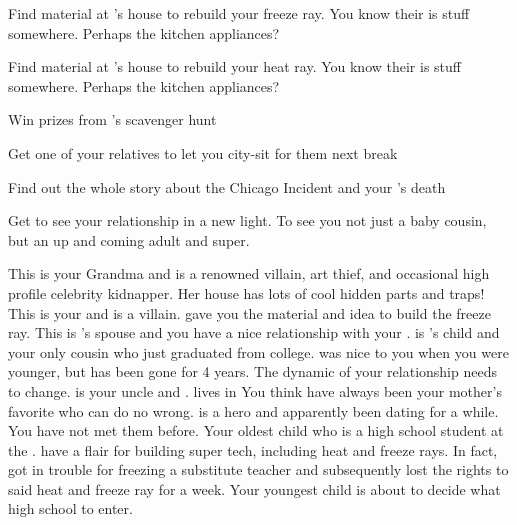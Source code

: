 \documentclass[char]{LRSguildcamp1}
\begin{document}
 
\begin{itemz}[Goals]
	\item Find material at \cGrandma{}'s house to rebuild your freeze ray. You know their is stuff somewhere. Perhaps the kitchen appliances? 
		\item Find material at \cGrandma{}'s house to rebuild your heat ray. You know their is stuff somewhere. Perhaps the kitchen appliances? 
		\item Win prizes from \cGrandma{}'s scavenger hunt
		\item Get one of your relatives to let you city-sit for them next break
		\item Find out the whole story about the Chicago Incident and your \cAS{\parent}'s death
		\item Get \cGrad{} to see your relationship in a new light. To see you not just a baby cousin, but an up and coming adult and super.
\end{itemz}

\begin{itemz}[Notes]
	\item 
\end{itemz}
\begin{contacts}
	\contact{\cGrandma{}} This is your Grandma and is a renowned villain, art thief, and occasional high profile celebrity kidnapper. Her house has lots of cool hidden parts and traps!
	\contact{\cOldest{}} This is your  \cOldest{\uncle} and is a villain.  gave you the material and idea to build the freeze ray.
	\contact{\cOS{}} This is \cOldest{}'s spouse and you have a nice relationship with your \cOS{\uncle}.
	\contact{\cGrad{}} \cGrad{} is \cOldest{}'s child and your only cousin who just graduated from college. \cGrad{} was nice to you when you were younger, but has been gone for 4 years. The dynamic of your relationship needs to change. 
	\contact{\cYoungest{}} \cYoungest{} is your uncle and \cYoungest{\hero}. \cYoungest{} lives in You think  have always been your mother's favorite who can do no wrong. 
	\contact{\cYS{}} \cYS{} is a hero and apparently been dating \cYoungest{} for a while. You have not met them before. 
	\contact{\cTeen{}} Your oldest child who is a high school student at the \pSuperSchool{}. \cTeen{\they} have a flair for building super tech, including heat and freeze rays. In fact, \cTeen{} got in trouble for freezing a substitute teacher and subsequently lost the rights to said heat and freeze ray for a week. 
	\contact{\cTween{}} Your youngest child is about to decide what high school to enter.
\end{contacts}
\end{document}
